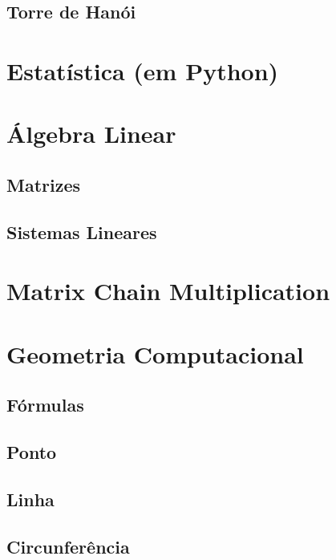         \subsection{Torre de Hanói}
            
    \section{Estatística (em Python)}
        
        \newpage
    \section{Álgebra Linear}
        \subsection{Matrizes}
            
            \newpage
        \subsection{Sistemas Lineares}
            
            \newpage
    \section{Matrix Chain Multiplication}
        
        \newpage
    \section{Geometria Computacional}
        \subsection{Fórmulas}
            
            \newpage
        
        \subsection{Ponto}
            
            \newpage
        \subsection{Linha}
            
            \newpage
        \subsection{Circunferência}
            
            \newpage

